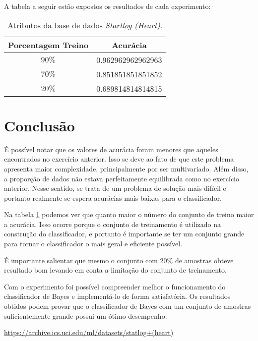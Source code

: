 \documentclass[12pt]{article}
\begin{document}
  

  \par A tabela a seguir estão expostos os resultados de cada experimento:
  
\begin{table}[h]
        \center
        \begin{tabular}{|c|c|}
            \hline
            Porcentagem Treino & Acurácia \\
            \hline
            $90\%$ & 0.962962962962963 \\
            \hline
             $70\%$ & 0.851851851851852 \\
             \hline
             $20\%$ & 0.689814814814815 \\
        	\hline
    	\end{tabular} 
        \caption{Atributos da base de dados \textit{Startlog (Heart)}.}
        \label{tab:heart}
\end{table}

\section{Conclusão}

  \par É possível notar que os valores de acurácia foram menores que aqueles encontrados no exercício anterior. Isso se deve ao fato de que este problema apresenta maior complexidade, principalmente por ser multivariado. Além disso, a proporção de dados não estava perfeitamente equilibrada como no exercício anterior.  Nesse sentido, se trata de um problema de solução mais difícil e portanto realmente se espera acurácias mais baixas para o classificador.
  
  \par Na tabela \ref{tab:heart} podemos ver que quanto maior o número do conjunto de treino maior a acurácia. Isso ocorre porque o conjunto de treinamento é utilizado na construção do classificador, e portanto é importante se ter um conjunto grande para tornar o classificador o mais geral e eficiente possível. 
  
  \par É importante salientar que mesmo o conjunto com 20\% de amostras obteve resultado bom levando em conta a limitação do conjunto de treinamento. 
  \par Com o experimento foi possível compreender melhor o funcionamento do classificador de Bayes e implementá-lo de forma satisfatória. Os resultados obtidos podem provar que o classificador de Bayes com um conjunto de amostras suficientemente grande possui um ótimo desempenho. 



\begin{thebibliography}{99}
		\label{Heart}  \url{https://archive.ics.uci.edu/ml/datasets/statlog+(heart)}
\end{thebibliography}	
\end{document}
